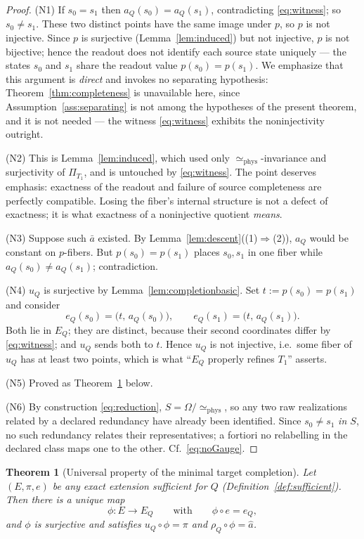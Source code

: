 \documentclass[11pt,reqno]{amsart}
\theoremstyle{plain}
\newtheorem{theorem}{Theorem}[section]
\theoremstyle{definition}
\theoremstyle{remark}
\begin{document}
\begin{proof}
(N1) If $s_0=s_1$ then $a_Q(s_0)=a_Q(s_1)$, contradicting \eqref{eq:witness}; so $s_0\neq s_1$. These two distinct points have the same image under $p$, so $p$ is not injective. Since $p$ is surjective (Lemma~\ref{lem:induced}) but not injective, $p$ is not bijective; hence the readout does not identify each source state uniquely --- the states $s_0$ and $s_1$ share the readout value $p(s_0)=p(s_1)$. We emphasize that this argument is \emph{direct} and invokes no separating hypothesis: Theorem~\ref{thm:completeness} is unavailable here, since Assumption~\ref{ass:separating} is not among the hypotheses of the present theorem, and it is not needed --- the witness \eqref{eq:witness} exhibits the noninjectivity outright.

(N2) This is Lemma~\ref{lem:induced}, which used only $\simeq_{\mathrm{phys}}$-invariance and surjectivity of $\Pi_{T_1}$, and is untouched by \eqref{eq:witness}. The point deserves emphasis: exactness of the readout and failure of source completeness are perfectly compatible. Losing the fiber's internal structure is not a defect of exactness; it is what exactness of a noninjective quotient \emph{means}.

(N3) Suppose such $\bar a$ existed. By Lemma~\ref{lem:descent}((1)$\Rightarrow$(2)), $a_Q$ would be constant on $p$-fibers. But $p(s_0)=p(s_1)$ places $s_0,s_1$ in one fiber while $a_Q(s_0)\neq a_Q(s_1)$; contradiction.

(N4) $u_Q$ is surjective by Lemma~\ref{lem:completionbasic}. Set $t:=p(s_0)=p(s_1)$ and consider
\[
e_Q(s_0)=\bigl(t,\,a_Q(s_0)\bigr),\qquad e_Q(s_1)=\bigl(t,\,a_Q(s_1)\bigr).
\]
Both lie in $E_Q$; they are distinct, because their second coordinates differ by \eqref{eq:witness}; and $u_Q$ sends both to $t$. Hence $u_Q$ is not injective, i.e.\ some fiber of $u_Q$ has at least two points, which is what ``$E_Q$ properly refines $T_1$'' asserts.

(N5) Proved as Theorem~\ref{thm:universal} below.

(N6) By construction \eqref{eq:reduction}, $S=\Omega/\!\simeq_{\mathrm{phys}}$, so any two raw realizations related by a declared redundancy have already been identified. Since $s_0\neq s_1$ \emph{in $S$}, no such redundancy relates their representatives; a fortiori no relabelling in the declared class maps one to the other. Cf.\ \eqref{eq:noGauge}.
\end{proof}

\begin{theorem}[Universal property of the minimal target completion]\label{thm:universal}
Let $(E,\pi,e)$ be any exact extension sufficient for $Q$ (Definition~\ref{def:sufficient}). Then there is a \emph{unique} map
\[
\phi\colon E\longrightarrow E_Q
\qquad\text{with}\qquad
\phi\circ e=e_Q ,
\]
and $\phi$ is surjective and satisfies $u_Q\circ\phi=\pi$ and $\rho_Q\circ\phi=\hat a$.
\end{theorem}
\end{document}
